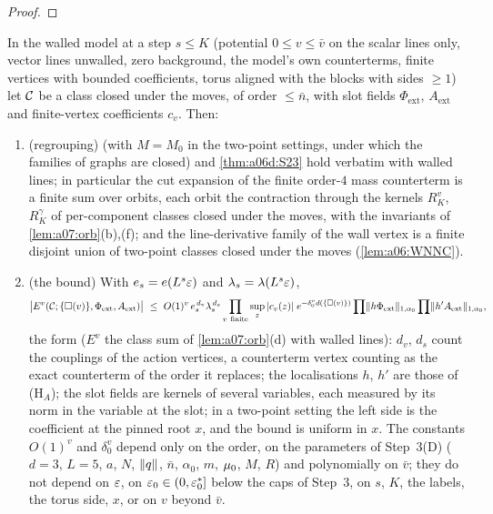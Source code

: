 \begin{proof}
\end{proof}

\begin{theorem}\label{thm:a06:WN}
In the walled model at a step $s\le K$ (potential $0\le v\le\bar v$ on the scalar lines only, vector lines unwalled, zero background, the model's own counterterms, finite \cite[(1.7)]{Ba3} vertices with bounded coefficients, torus aligned with the blocks with sides $\ge1$) let $\mathcal C$ be a class closed under the moves, of order $\le\bar n$, with slot fields $\Phi_{\mathrm{ext}}$, $A_{\mathrm{ext}}$ and finite-vertex coefficients $c_v$. Then:
\begin{enumerate}[label=\textup{(\roman*)},nosep,leftmargin=*]
\item\textup{(regrouping)}  (with $M=M_0$ in the two-point settings, under which the families of \cite[(1.23)]{Ba3} graphs are closed) and \cref{thm:a06d:S23} hold verbatim with walled lines; in particular the cut expansion of the finite order-$4$ mass counterterm is a finite sum over orbits, each orbit the contraction through the kernels $R^v_K$, $R^\gamma_K$ of per-component classes closed under the moves, with the invariants of \cref{lem:a07:orb}(b),(f); and the line-derivative family of the wall vertex is a finite disjoint union of two-point classes closed under the moves (\cref{lem:a06:WNNC}).
\item\textup{(the bound)} With $e_s=e(L^s\varepsilon)$ and $\lambda_s=\lambda(L^s\varepsilon)$,
\[
\big|E^v(\cC;\{\square(v)\},\Phi_{\mathrm{ext}},A_{\mathrm{ext}})\big|\ \le\ O(1)^v\,e_s^{\,d_v}\lambda_s^{\,d_s}\prod_{v\ \mathrm{finite}}\sup_z|c_v(z)|\;e^{-\delta^v_0d(\{\square(v)\})}\prod\norm{h\Phi_{\mathrm{ext}}}_{1,\alpha_0}\prod\norm{h'A_{\mathrm{ext}}}_{1,\alpha_0},
\]
the form \cite[(1.33)]{Ba3} ($E^v$ the class sum of \cref{lem:a07:orb}(d) with walled lines): $d_v$, $d_s$ count the couplings of the action vertices, a counterterm vertex counting as the exact counterterm of the order it replaces; the localisations $h$, $h'$ are those of (H$_A$); the slot fields are kernels of several variables, each measured by its norm \cite[(1.32)]{Ba3} in the variable at the slot; in a two-point setting the left side is the coefficient at the pinned root $x$, and the bound is uniform in $x$. The constants $O(1)^v$ and $\delta^v_0$ depend only on the order, on the parameters of Step~3(D) ($d=3$, $L=5$, $a$, $N$, $\lVert q\rVert$, $\bar n$, $\alpha_0$, $m$, $\mu_0$, $M$, $R$) and polynomially on $\bar v$; they do not depend on $\varepsilon$, on $\varepsilon_0\in(0,\varepsilon_0^*]$ below the caps of Step~3, on $s$, $K$, the labels, the torus side, $x$, or on $v$ beyond $\bar v$.

\end{enumerate}
\end{theorem}
